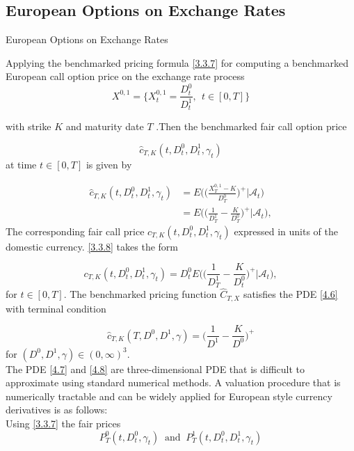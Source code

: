 \documentclass[unknownkeysallowed, compress]{beamer}
\theoremstyle{plain}
\begin{document}
\subsection{European Options on Exchange Rates}
\begin{frame}[allowframebreaks]{European Options on Exchange Rates}

\noindent
\par Applying the benchmarked pricing formula \eqref{3.3.7} for computing a
benchmarked European call option price on the exchange rate process
$$
X^{0,1} = \{X_t^{0,1} = \frac{D_t^0}{D_t^1},~~t\in[0,T]\}
$$

with strike $K$ and maturity date $T$ .Then the benchmarked fair call option price

$$
\hat{c}_{T,K}(t,D_t^0,D_t^1,\gamma_t)
$$
at time $t\in[0,T]$ is given by

\begin{equation}\label{4.2.1}
\begin{split}
\hat{c}_{T,K}(t,D_t^0,D_t^1,\gamma_t)& = E\bigg(\bigg(\frac{X_T^{0,1} - K}{D_T^0}\bigg)^+\bigg|\mathcal{A}_t\bigg)\\
& = E\bigg(\bigg(\frac{1}{D_T^1} - \frac{K}{D_T^0}\bigg)^+\bigg|\mathcal{A}_t\bigg),
\end{split}
\end{equation}
The corresponding fair call price ${c}_{T,K}(t,D_t^0,D_t^1,\gamma_t)$ expressed in units of the domestic currency. \eqref{3.3.8} takes the form


\begin{equation}\label{4.2.2}
{c}_{T,K}(t,D_t^0,D_t^1,\gamma_t) = D_t^0E\bigg(\bigg(\frac{1}{D_T^1} - \frac{K}{D_t^0}\bigg)^+\bigg|\mathcal{A}_t\bigg),
\end{equation}
for $t\in [0,T]$. The benchmarked pricing function $\hat{C}_{T,X}$ satisfies the PDE \eqref{4.6} with terminal condition

\begin{equation}\label{4.2.3}
\hat{c}_{T,K}(T,D^0,D^1,\gamma) = \bigg(\frac{1}{D^1}-\frac{K}{D^0}\bigg)^+
\end{equation}
for $(D^0,D^1,\gamma)\in(0,\infty)^3$.\\

The PDE \eqref{4.7} and \eqref{4.8} are three-dimensional PDE that is difficult to
approximate using standard numerical methods. A valuation procedure that is
numerically tractable and can be widely applied for European style currency
derivatives is as follows:\\
Using \eqref{3.3.7} the fair prices
\begin{equation}\label{6.3}
P_T^0(t,D_t^0,\gamma_t)~\mbox{  and  }~ P_T^1(t,D_t^0,D_t^1,\gamma_t)
\end{equation}


\end{frame}
\end{document}
